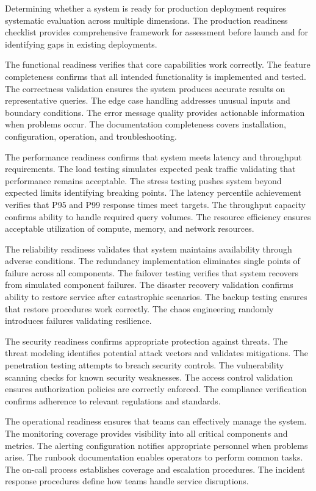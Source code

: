 Determining whether a system is ready for production deployment requires systematic evaluation across multiple dimensions. The production readiness checklist provides comprehensive framework for assessment before launch and for identifying gaps in existing deployments.

The functional readiness verifies that core capabilities work correctly. The feature completeness confirms that all intended functionality is implemented and tested. The correctness validation ensures the system produces accurate results on representative queries. The edge case handling addresses unusual inputs and boundary conditions. The error message quality provides actionable information when problems occur. The documentation completeness covers installation, configuration, operation, and troubleshooting.

The performance readiness confirms that system meets latency and throughput requirements. The load testing simulates expected peak traffic validating that performance remains acceptable. The stress testing pushes system beyond expected limits identifying breaking points. The latency percentile achievement verifies that P95 and P99 response times meet targets. The throughput capacity confirms ability to handle required query volumes. The resource efficiency ensures acceptable utilization of compute, memory, and network resources.

The reliability readiness validates that system maintains availability through adverse conditions. The redundancy implementation eliminates single points of failure across all components. The failover testing verifies that system recovers from simulated component failures. The disaster recovery validation confirms ability to restore service after catastrophic scenarios. The backup testing ensures that restore procedures work correctly. The chaos engineering randomly introduces failures validating resilience.

The security readiness confirms appropriate protection against threats. The threat modeling identifies potential attack vectors and validates mitigations. The penetration testing attempts to breach security controls. The vulnerability scanning checks for known security weaknesses. The access control validation ensures authorization policies are correctly enforced. The compliance verification confirms adherence to relevant regulations and standards.

The operational readiness ensures that teams can effectively manage the system. The monitoring coverage provides visibility into all critical components and metrics. The alerting configuration notifies appropriate personnel when problems arise. The runbook documentation enables operators to perform common tasks. The on-call process establishes coverage and escalation procedures. The incident response procedures define how teams handle service disruptions.

